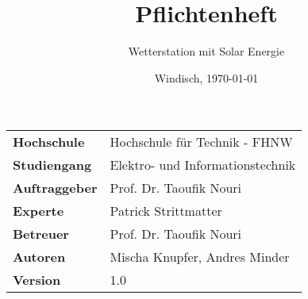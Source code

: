 \documentclass[final]{fhnwreport}       %
\title{\Huge{\textbf{Pflichtenheft}}\\}          %
\author{\huge{Wetterstation mit Solar Energie}}          %
\date{Windisch, \today}             %
\begin{document}
\maketitle
\vspace*{-0.5cm}						    %
\vfill
\begin{figure}[H]
\centering
\end{figure}
\vfill

{
\renewcommand\arraystretch{2}
\begin{center}
\begin{tabular}{>{\bf}p{4cm} l}
Hochschule		&	Hochschule für Technik - FHNW\\
Studiengang		&	Elektro- und Informationstechnik\\
Auftraggeber	&	Prof. Dr. Taoufik Nouri\\
Experte			&	Patrick Strittmatter\\
Betreuer		&	Prof. Dr. Taoufik Nouri\\
Autoren		&	Mischa Knupfer, Andres Minder\\
Version			&	1.0 %
\end{tabular}
\end{center}
}

\clearpage
			
\thispagestyle{empty}


%

\tableofcontents
\clearpage








{%
}
\end{document}
